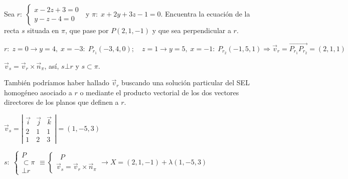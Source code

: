 \begin{ejre}
	Sea $r:\; \begin{cases} x-2z+3=0\\y-z-4=0\end{cases}\; $ y $\pi:\; x+2y+3z-1=0$. Encuentra la ecuación de la recta $s$ situada en $\pi$, que pase por $P(2,1,-1)$ y que sea perpendicular a $r$.
\end{ejre}
\begin{proofw}\renewcommand{\qedsymbol}{$\diamond$}	
\noindent $r:\; z=0\to y=4,\; x=-3:\; P_{r_1}(-3,4,0); \quad z=1 \to y=5,\; x=-1:\; P_{r_2}(-1,5,1) \Rightarrow \vec v_r=\overrightarrow{P_{r_1}P_{r_2}}=(2,1,1)$
 
\noindent $\vec v_s=\vec v_r \times \vec n_{\pi}$, así, $s\bot r$ y $s \subset \pi$.

\noindent \textcolor{gris}{También podríamos haber hallado $\vec v_r$ buscando una solución particular del SEL homogéneo asociado a $r$ o mediante el producto vectorial de los dos vectores directores de los planos que definen a $r$.}
	
\noindent $\vec v_s= \left| \begin{matrix} \vec i & \vec j & \vec k \\ 2&1&1 \\ 1&2&3 \end{matrix} \right|=(1,-5,3)$

\noindent $s:\; \begin{cases} P \\ \subset \pi \\ \bot r \end{cases} \equiv \begin{cases} \;\; P \\ \vec v_s=\vec v_r \times \vec n_{\pi} \end{cases} \to X=(2,1,-1)+\lambda(1,-5,3)$
\end{proofw}


